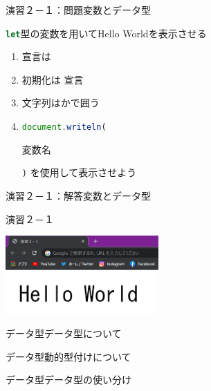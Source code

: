 \documentclass[dvipdfmx]{beamer}
\begin{document}
  \begin{frame}{演習２－１：問題}{変数とデータ型}
    \begin{Large}\lstinline[language=javascript]|let|型の変数を用いて{\color{string}Hello World}を表示させる\end{Large}
    \begin{enumerate}
      \setlength{\itemsep}{5mm}
      \item \alert{宣言}は 
      \item \alert{初期化}は 宣言 
      \item 文字列はかで囲う
      \item \lstinline[language=javascript]|document.writeln(|{\color{string}\begin{footnotesize}変数名\end{footnotesize}}\lstinline[language=javascript]|)|
      を使用して表示させよう
    \end{enumerate}
  \end{frame}

  \begin{frame}{演習２－１：解答}{変数とデータ型}
    \begin{exampleblock}{演習２－１}
      
    \end{exampleblock}
    \vspace{5mm}
    \centering
    \includegraphics[height=3cm]{pic/Chap2/pic2.png}
  \end{frame}

  \begin{frame}{データ型}{データ型について}
    
  \end{frame}

  \begin{frame}{データ型}{動的型付けについて}
    
  \end{frame}
  
  \begin{frame}{データ型}{データ型の使い分け}
    
  \end{frame}
\end{document}
